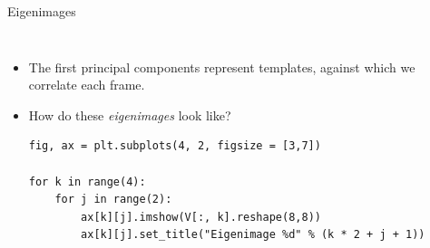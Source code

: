 \documentclass[10pt, aspectratio=169]{beamer} %
\begin{document}
\begin{frame}[fragile, allowframebreaks=0.8]{Eigenimages}
		\begin{columns}
	    \begin{itemize}
\item The first principal components represent templates, against which we correlate each frame.
\item How do these \emph{eigenimages} look like?
\begin{lstlisting}
fig, ax = plt.subplots(4, 2, figsize = [3,7])

for k in range(4):
    for j in range(2):
        ax[k][j].imshow(V[:, k].reshape(8,8))
        ax[k][j].set_title("Eigenimage %d" % (k * 2 + j + 1))
\end{lstlisting}

\end{itemize}
			

\end{columns}
\end{frame}
\end{document}
